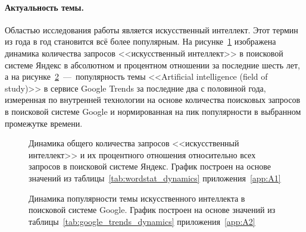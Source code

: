 \paragraph{\indent Актуальность темы.}
Областью исследования работы является искусственный интеллект. Этот термин из года в год становится всё более популярным. На рисунке~\cref{fig:wordstat_dynamics} изображена динамика количества запросов <<искусственный интеллект>> в поисковой системе Яндекс в абсолютном и процентном отношении за последние шесть лет, а на рисунке~\cref{fig:google_trends_dynamics}~---~популярность темы <<Artificial intelligence (field of study)>> в сервисе Google Trends за последние два с половиной года, измеренная по внутренней технологии на основе количества поисковых запросов в поисковой системе Google и нормированная на пик популярности в выбранном промежутке времени.

\begin{figure}[h!]
    \caption{Динамика общего количества запросов <<искусственный интеллект>> и их процентного отношения относительно всех запросов в поисковой системе Яндекс. График построен на основе значений из таблицы~\cref{tab:wordstat_dynamics} приложения~\cref{app:A1}}\label{fig:wordstat_dynamics}
\end{figure}

\begin{figure}[h!]
    \caption{Динамика популярности темы искусственного интеллекта в поисковой системе Google. График построен на основе значений из таблицы~\cref{tab:google_trends_dynamics} приложения~\cref{app:A2}}\label{fig:google_trends_dynamics}
\end{figure}


